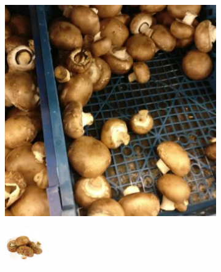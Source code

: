 \begin{figure}[t]
\begin{subfigure}[b]{0.14\textwidth}
		\caption{}
		\label{subfig:royal-gala-decoded}
	\end{subfigure} %
	\begin{subfigure}[b]{0.14\textwidth}
		\centering
		\includegraphics[width=\textwidth]{PaperA/decoded-image-figure/Mushroom-Brown-Cap_027.jpg}
		\caption{}
		\label{subfig:brown-cap-natural}
	\end{subfigure} %
	\begin{subfigure}[b]{0.14\textwidth}
		\centering
		\includegraphics[width=\textwidth]{PaperA/decoded-image-figure/densenet_nov11/Mushroom-Brown-Cap_decoded.png}

\end{subfigure}
\end{figure}
